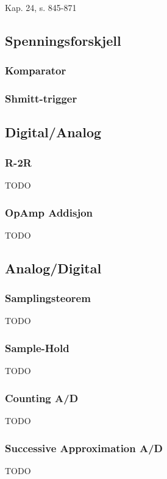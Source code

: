 Kap. 24, s. 845-871

\subsection{Spenningsforskjell}
  \subsubsection{Komparator}
    
  \subsubsection{Shmitt-trigger}
    
\subsection{Digital/Analog}
  \subsubsection{R-2R}
    TODO
  \subsubsection{OpAmp Addisjon}
    TODO
\subsection{Analog/Digital}
  \subsubsection{Samplingsteorem}
    TODO
  \subsubsection{Sample-Hold}
    TODO
  \subsubsection{Counting A/D}
    TODO
  \subsubsection{Successive Approximation A/D}
    TODO
